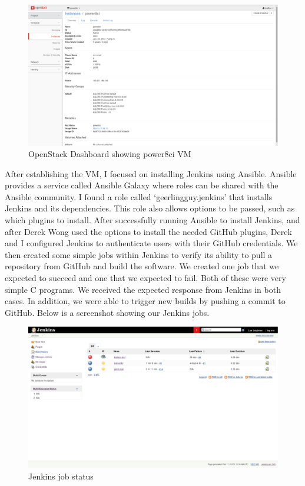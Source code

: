 \documentclass[10pt,onecolumn,journal,draftclsnofoot]{IEEEtran}
\begin{document}
\begin{figure}[H]
  \centering
  \includegraphics[width=\textwidth, keepaspectratio]{openstack.eps}
  \caption{OpenStack Dashboard showing power8ci VM}
\end{figure}

After establishing the VM, I focused on installing Jenkins using Ansible.
Ansible provides a service called Ansible Galaxy where roles can be shared with the Ansible community.
I found a role called `geerlingguy.jenkins' that installs Jenkins and its dependencies.
This role also allows options to be passed, such as which plugins to install.
After successfully running Ansible to install Jenkins, and after Derek Wong used the options to install the needed GitHub plugins,
Derek and I configured Jenkins to authenticate users with their GitHub credentials.
We then created some simple jobs within Jenkins to verify its ability to pull a repository from GitHub and build the software.
We created one job that we expected to succeed and one that we expected to fail.
Both of these were very simple C programs.
We received the expected response from Jenkins in both cases.
In addition, we were able to trigger new builds by pushing a commit to GitHub.
Below is a screenshot showing our Jenkins jobs.
\begin{figure}[H]
  \centering
  \includegraphics[width=\textwidth, keepaspectratio]{jenkins.eps}
  \caption{Jenkins job status}
\end{figure}
\end{document}
